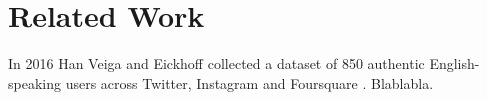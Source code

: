 \chapter{Related Work}\label{ch:related-work}

In 2016 Han Veiga and Eickhoff collected a dataset of 850 authentic English-speaking users across Twitter, Instagram and Foursquare \cite{OSN}. Blablabla.